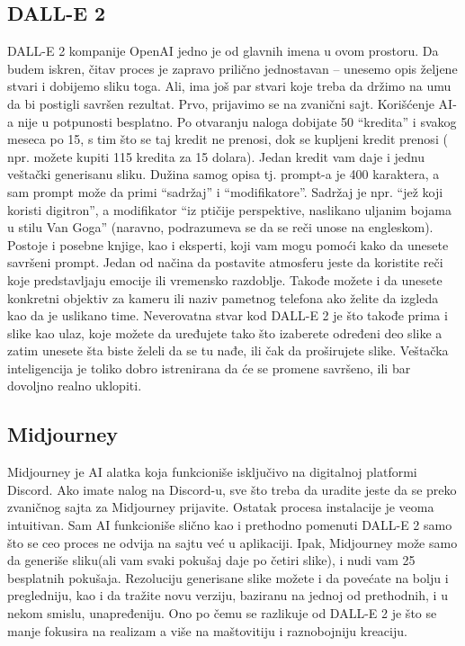 \documentclass[12pt, letterpaper]{article}
\begin{document}
\subsection{DALL-E 2}
DALL-E 2 kompanije OpenAI\cite{OpenAI} jedno je od glavnih imena u ovom prostoru. Da budem iskren, čitav proces je zapravo prilično jednostavan – unesemo opis željene stvari i dobijemo sliku toga. Ali, ima još par stvari koje treba da držimo na umu da bi postigli savršen rezultat. Prvo, prijavimo se na zvanični sajt. Korišćenje AI-a nije u potpunosti besplatno. Po otvaranju naloga dobijate 50 “kredita” i svakog meseca po 15, s tim što se taj kredit ne prenosi, dok se kupljeni kredit prenosi ( npr. možete kupiti 115 kredita za 15 dolara). Jedan kredit vam daje i jednu veštački generisanu sliku. Dužina samog opisa tj. prompt-a je 400 karaktera, a sam prompt može da primi “sadržaj” i “modifikatore”. Sadržaj je npr. “jež koji koristi digitron”, a modifikator “iz ptičije perspektive, naslikano uljanim bojama u stilu Van Goga” (naravno, podrazumeva se da se reči unose na engleskom)\cite{Prompt}. Postoje i posebne knjige, kao i eksperti, koji vam mogu pomoći kako da unesete savršeni prompt. Jedan od načina da postavite atmosferu jeste da koristite reči koje predstavljaju emocije ili vremensko razdoblje. Takođe možete i da unesete konkretni objektiv za kameru ili naziv pametnog telefona ako želite da izgleda kao da je uslikano time. Neverovatna stvar kod DALL-E 2 je što takođe prima i slike kao ulaz, koje možete da uređujete tako što izaberete određeni deo slike a zatim unesete šta biste želeli da se tu nađe, ili čak da proširujete slike. Veštačka inteligencija je toliko dobro istrenirana da će se promene savršeno, ili bar dovoljno realno uklopiti. 
\subsection{Midjourney}
Midjourney je AI alatka koja funkcioniše isključivo na digitalnoj platformi Discord. Ako imate nalog na Discord-u, sve što treba da uradite jeste da se preko zvaničnog sajta za Midjourney prijavite. Ostatak procesa instalacije je veoma intuitivan. Sam  AI funkcioniše slično kao i prethodno pomenuti DALL-E 2 samo što se ceo proces ne odvija na sajtu već u aplikaciji. Ipak,  Midjourney može samo da generiše sliku(ali vam svaki pokušaj daje po četiri slike), i nudi vam 25 besplatnih pokušaja. Rezoluciju generisane slike možete i da povećate na bolju i pregledniju, kao i da tražite novu verziju, baziranu na jednoj od  prethodnih, i u nekom smislu, unapređeniju. Ono po čemu se razlikuje od DALL-E 2 je što se manje fokusira na realizam a više na maštovitiju i raznobojniju kreaciju.
\end{document}
